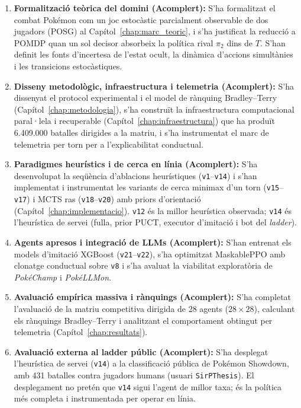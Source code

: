 \begin{enumerate}
    \item \textbf{Formalització teòrica del domini (Acomplert):} S'ha formalitzat el combat Pokémon com un joc estocàstic parcialment observable de dos jugadors (POSG) al Capítol~\ref{chap:marc_teoric}, i s'ha justificat la reducció a POMDP quan un sol decisor absorbeix la política rival $\pi_2$ dins de $T$. S'han definit les fonts d'incertesa de l'estat ocult, la dinàmica d'accions simultànies i les transicions estocàstiques.
    \item \textbf{Disseny metodològic, infraestructura i telemetria (Acomplert):} S'ha dissenyat el protocol experimental i el model de rànquing Bradley--Terry (Capítol~\ref{chap:metodologia}), s'ha construït la infraestructura computacional paral·lela i recuperable (Capítol~\ref{chap:infraestructura}) que ha produït 6.409.000 batalles dirigides a la matriu, i s'ha instrumentat el marc de telemetria per torn per a l'explicabilitat conductual.
    \item \textbf{Paradigmes heurístics i de cerca en línia (Acomplert):} S'ha desenvolupat la seqüència d'ablacions heurístiques (\texttt{v1}--\texttt{v14}) i s'han implementat i instrumentat les variants de cerca minimax d'un torn (\texttt{v15}--\texttt{v17}) i MCTS ras (\texttt{v18}--\texttt{v20}) amb priors d'orientació (Capítol~\ref{chap:implementacio}). \texttt{v12} és la millor heurística observada; \texttt{v14} és l'heurística de servei (fulla, prior PUCT, executor d'imitació i bot del \emph{ladder}).
    \item \textbf{Agents apresos i integració de LLMs (Acomplert):} S'han entrenat els models d'imitació XGBoost (\texttt{v21}--\texttt{v22}), s'ha optimitzat MaskablePPO amb clonatge conductual sobre \texttt{v8} i s'ha avaluat la viabilitat exploratòria de \textit{PokéChamp} i \textit{PokéLLMon}.
    \item \textbf{Avaluació empírica massiva i rànquings (Acomplert):} S'ha completat l'avaluació de la matriu competitiva dirigida de 28 agents ($28\times 28$), calculant els rànquings Bradley--Terry i analitzant el comportament obtingut per telemetria (Capítol~\ref{chap:resultats}).
    \item \textbf{Avaluació externa al ladder públic (Acomplert):} S'ha desplegat l'heurística de servei (\texttt{v14}) a la classificació pública de Pokémon Showdown, amb 431 batalles contra jugadors humans (usuari \texttt{SirPThesis}). El desplegament no pretén que \texttt{v14} sigui l'agent de millor taxa; és la política més completa i instrumentada per operar en línia.
\end{enumerate}

